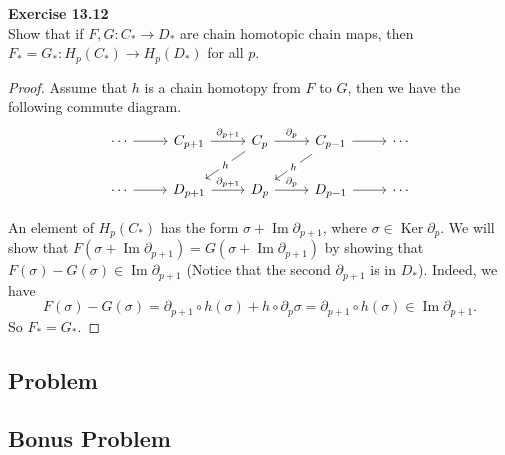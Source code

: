 \documentclass[12pt, a4paper]{article}
\theoremstyle{plain}
\DeclareMathOperator{\im}{Im}
\DeclareMathOperator{\Ker}{Ker}
\newenvironment{exercise}[2][Exercise]
    { \begin{mdframed}[backgroundcolor=gray!20] \textbf{#1 #2} \\}
    {  \end{mdframed}}
\begin{document}
\begin{exercise}{13.12}
    Show that if $F,G\colon C_*\to D_*$ are chain homotopic chain maps, then $F_*=G_*\colon H_p(C_*)\to H_p(D_*)$ for all $p$.
\end{exercise}
    \begin{proof}
        Assume that $h$ is a chain homotopy from $F$ to $G$, then we have the following commute diagram.
\[\begin{tikzcd}
	\cdots & {C_{p+1}} & {C_p} & {C_{p-1}} & \cdots \\
	\cdots & {D_{p+1}} & {D_p} & {D_{p-1}} & \cdots
	\arrow["{\partial_{p+1}}", from=1-2, to=1-3]
	\arrow["{\partial_p}", from=1-3, to=1-4]
	\arrow["{\partial_{p+1}}", from=2-2, to=2-3]
	\arrow["{\partial_p}", from=2-3, to=2-4]
	\arrow[from=1-1, to=1-2]
	\arrow[from=2-1, to=2-2]
	\arrow[from=2-4, to=2-5]
	\arrow[from=1-4, to=1-5]
	\arrow["h"{description}, from=1-3, to=2-2]
	\arrow["h"{description}, from=1-4, to=2-3]
\end{tikzcd}\]

    An element of $H_p(C_*)$ has the form $\sigma+\im \partial_{p+1}$, where $\sigma\in \Ker\partial_p$. We will show that $F(\sigma +\im \partial_{p+1}) = G(\sigma+\im \partial_{p+1})$ by showing that $F(\sigma)-G(\sigma)\in \im \partial_{p+1}$ (Notice that the second $\partial_{p+1}$ is in $D_*$). Indeed, we have
    \[
    F(\sigma)-G(\sigma) = \partial_{p+1} \circ h(\sigma)+h\circ \partial_{p}\sigma = \partial_{p+1}\circ h(\sigma)\in \im \partial_{p+1}.
    \]
    So $F_*=G_*$.
    \end{proof}



\subsection{Problem}

\subsection{Bonus Problem}
\end{document}
